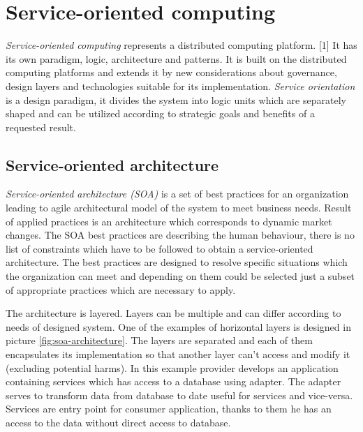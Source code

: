 \chapter{Service-oriented computing}
\label{chap:service-oriented computing}
\emph{Service-oriented computing} represents a distributed computing platform. [1] It has its own paradigm, logic, architecture and patterns. It is built on the distributed computing platforms and extends it by new considerations about governance, design layers and technologies suitable for its implementation.
\emph{Service orientation} is a design paradigm, it divides the system into logic units which are separately shaped and can be utilized according to strategic goals and benefits of a requested result.

\section{Service-oriented architecture}
\emph{Service-oriented architecture (SOA)} is a set of best practices for an organization leading to agile architectural model of the system to meet business needs. Result of applied practices is an architecture which corresponds to dynamic market changes. The SOA best practices are describing the human behaviour, there is no list of constraints which have to be followed to obtain a service-oriented architecture. The best practices are designed to resolve specific situations which the organization can meet and depending on them could be selected just a subset of appropriate practices which are necessary to apply.

The architecture is layered. Layers can be multiple and can differ according to needs of designed system. One of the examples of horizontal layers is designed in picture \ref{fig:soa-architecture}. The layers are separated and each of them encapsulates its implementation so that another layer can't access and modify it (excluding potential harms). In this example provider develops an application containing services which has access to a database using adapter. The \gls{adapter} serves to transform data from database to date useful for services and vice-versa. Services are entry point for consumer application, thanks to them he has an access to the data without direct access to database.

